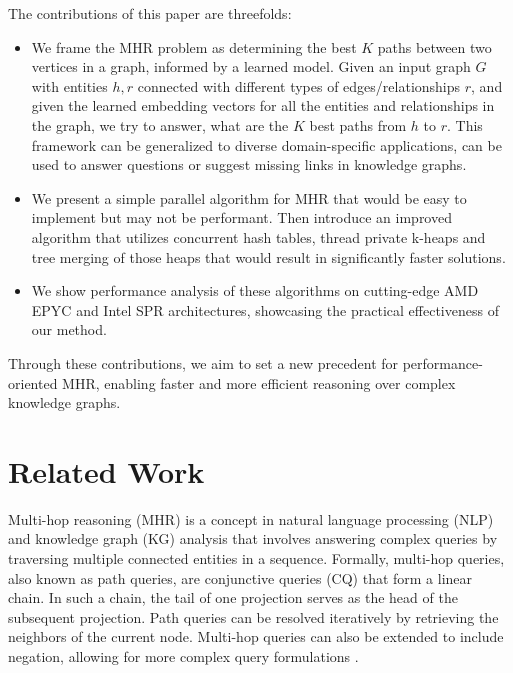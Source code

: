 \documentclass[sigconf]{acmart}
\begin{document}
The contributions of this paper are threefolds:

\begin{itemize}
\item We frame the MHR problem as determining the best $K$ paths between two vertices in a graph, informed by a learned model. Given an input graph $G$ with entities $h, r$ connected with different types of edges/relationships $r$, and given the learned embedding vectors for all the entities and relationships in the graph, we try to answer, what are the $K$ best paths from $h$ to $r$. This framework can be generalized to diverse domain-specific applications, can be used to answer questions or suggest missing links in knowledge graphs.

\item We present a simple parallel algorithm for MHR that would be easy to implement but may not be performant. Then introduce an improved algorithm that utilizes concurrent hash tables, thread private k-heaps and tree merging of those heaps that would result in significantly faster solutions.

\item We show performance analysis of these algorithms on cutting-edge AMD EPYC and Intel SPR architectures, showcasing the practical effectiveness of our method.

\end{itemize}
Through these contributions, we aim to set a new precedent for performance-oriented MHR, enabling faster and more efficient reasoning over complex knowledge graphs.

\section{Related Work}

Multi-hop reasoning (MHR) is a concept in natural language processing (NLP) and knowledge graph (KG) analysis that involves answering complex queries by traversing multiple connected entities in a sequence. Formally, multi-hop queries, also known as path queries, are conjunctive queries (CQ) that form a linear chain. In such a chain, the tail of one projection serves as the head of the subsequent projection. Path queries can be resolved iteratively by retrieving the neighbors of the current node. Multi-hop queries can also be extended to include negation, allowing for more complex query formulations \cite{CLQAinNGR}.
\end{document}
